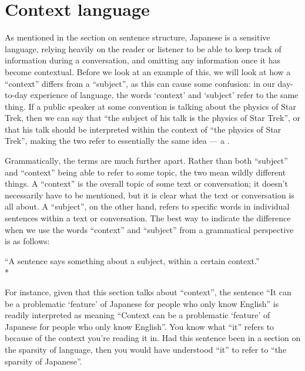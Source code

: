 \documentclass[11pt, b5paper, twoside, openright, onecolumn]{book}
\newenvironment{exampleblock}{
\setlength{\parindent}{0.6in}
\begin{minipage}[t]{\dimexpr\textwidth-\parindent}}
{\end{minipage}}
\begin{document}
\section{Context language}

As mentioned in the section on sentence structure‚ Japanese is a  sensitive language‚ relying heavily on the reader or listener to be able to keep track of information during a conversation‚ and omitting any information once it has become contextual. Before we look at an example of this‚ we will look at how a “context” differs from a “subject”‚ as this can cause some confusion: in our day-to-day experience of language‚ the words ‘context’ and ‘subject’ refer to the same thing. If a public speaker at some convention is talking about the physics of Star Trek‚ then we can say that “the subject of his talk is the physics of Star Trek”‚ or that his talk should be interpreted within the context of “the physics of Star Trek”‚ making the two refer to essentially the same idea — a .

Grammatically‚ the terms are much further apart. Rather than both “subject” and “context” being able to refer to some topic‚ the two mean wildly different things. A “context” is the overall topic of some text or conversation; it doesn’t necessarily have to be mentioned‚ but it is clear what the text or conversation is all about. A “subject”‚ on the other hand‚ refers to specific words in individual sentences within a text or conversation. The best way to indicate the difference when we use the words “context” and “subject” from a grammatical perspective is as follows:

\vspace{0.4cm}
\begin{exampleblock}
“A sentence says something about a subject‚ within a certain context.” \\* 
\end{exampleblock}
\vspace{0.2cm}

For instance‚ given that this section talks about “context”‚ the sentence “It can be a problematic ‘feature’ of Japanese for people who only know English” is readily interpreted as meaning “Context can be a problematic ‘feature’ of Japanese for people who only know English”. You know what “it” refers to because of the context you’re reading it in. Had this sentence been in a section on the sparsity of language‚ then you would have understood “it” to refer to “the sparsity of Japanese”.
\end{document}
